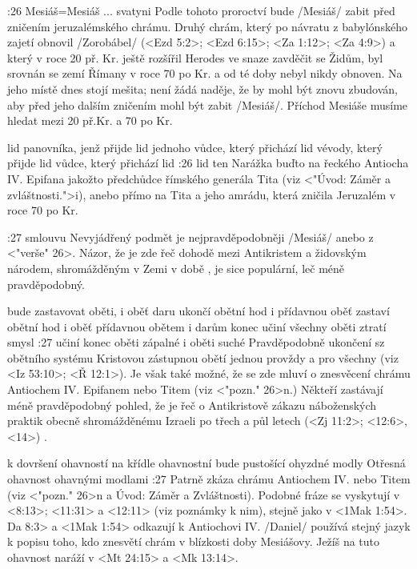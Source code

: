 :26 {Mesiáš}={Mesiáš ... svatyni} Podle tohoto proroctví bude \x/Mesiáš/ zabit před zničením jeruzalémského chrámu. Druhý chrám, který po návratu z babylónského zajetí obnovil \x/Zorobábel/ 
(<Ezd 5:2>; <Ezd 6:15>; <Za 1:12>; <Za 4:9>) a který v roce 20 př. Kr. ještě rozšířil Herodes ve snaze zavděčit se Židům, byl srovnán se zemí Římany v roce 70 po Kr. a od té doby nebyl nikdy obnoven. Na jeho místě dnes stojí mešita; není žádá naděje, že by mohl být znovu zbudován, aby před jeho dalším zničením mohl být zabit \x/Mesiáš/. Příchod Mesiáše musíme hledat mezi 20 př.Kr. a 70 po Kr.

    {lid panovníka, jenž přijde}   %
    {lid jednoho vůdce, který přichází}   %
    {lid vévody, který přijde}   %
    {lid vůdce, který přichází}   %
    {lid}   %
:26 {lid ten} Narážka buďto na řeckého Antiocha IV. Epifana jakožto předchůdce římského generála Tita (viz <"Úvod: Záměr a zvláštnosti.">i), anebo přímo na Tita a jeho amrádu, která zničila Jeruzalém v roce 70 po Kr.

:27 {smlouvu} Nevyjádřený podmět  je nejpravděpodobněji \x/Mesiáš/ anebo  z <"verše" 26>. Názor, že je zde řeč dohodě mezi Antikristem a židovským národem, shromážděným v Zemi v době , je sice populární, leč méně pravděpodobný.

 {bude zastavovat oběti, i oběť daru} {ukončí obětní hod i přídavnou oběť} {zastaví obětní hod i oběť přídavnou} {obětem i darům konec učiní} {všechny oběti ztratí smysl}
:27 {učiní konec oběti zápalné i oběti suché} Pravděpodobně ukončení sz obětního systému Kristovou zástupnou obětí jednou provždy a pro všechny (viz <Iz 53:10>; <Ř 12:1>).
Je však také možné, že se zde mluví o znesvěcení chrámu  Antiochem IV. Epifanem nebo Titem (viz <"pozn." 26>n.) Někteří zastávají méně pravděpodobný pohled, že je řeč o Antikristově zákazu náboženských praktik obecně shromážděnému Izraeli po třech a půl letech (<Zj 11:2>; <12:6>, <14>)  .

    {k dovršení ohavností}   %
    {na křídle ohavnostní bude pustošící}   %
    {ohyzdné modly}   %
    {Otřesná ohavnost}   %
    {ohavnými modlami}   %
:27 {} Patrně zkáza chrámu Antiochem IV. nebo Titem (viz <"pozn." 26>n a Úvod: Záměr a Zvláštnosti). Podobné fráze se vyskytují v <8:13>; <11:31> a <12:11> (viz poznámky k nim), stejně jako v <1Mak 1:54>. \<Da 8:3> a <1Mak 1:54> odkazují k Antiochovi IV. \x/Daniel/ používá stejný jazyk k popisu toho, kdo znesvětí chrám v blízkosti doby Mesiášovy. Ježíš na tuto ohavnost naráží v <Mt 24:15> a <Mk 13:14>.


